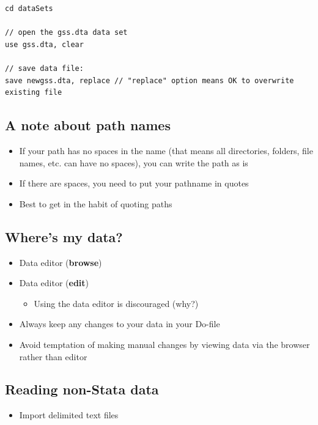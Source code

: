 \documentclass[]{book}
\providecommand{\tightlist}{%
  \setlength{\itemsep}{0pt}\setlength{\parskip}{0pt}}
\begin{document}
\begin{verbatim}
cd dataSets

// open the gss.dta data set
use gss.dta, clear

// save data file:
save newgss.dta, replace // "replace" option means OK to overwrite existing file
\end{verbatim}

\subsection{A note about path names}\label{a-note-about-path-names}

\begin{itemize}
\tightlist
\item
  If your path has no spaces in the name (that means all directories,
  folders, file names, etc. can have no spaces), you can write the path
  as is
\item
  If there are spaces, you need to put your pathname in quotes
\item
  Best to get in the habit of quoting paths
\end{itemize}

\subsection{Where's my data?}\label{wheres-my-data}

\begin{itemize}
\tightlist
\item
  Data editor (\textbf{browse})
\item
  Data editor (\textbf{edit})

  \begin{itemize}
  \tightlist
  \item
    Using the data editor is discouraged (why?)
  \end{itemize}
\item
  Always keep any changes to your data in your Do-file
\item
  Avoid temptation of making manual changes by viewing data via the
  browser rather than editor
\end{itemize}

\subsection{Reading non-Stata data}\label{reading-non-stata-data}

\begin{itemize}
\tightlist
\item
  Import delimited text files
\end{itemize}
\end{document}
